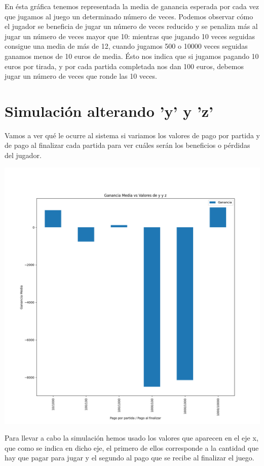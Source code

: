 \documentclass[11pt,a4paper]{report}
\begin{document}
En ésta gráfica tenemos representada la media de ganancia esperada por cada vez que jugamos al juego un determinado número de veces. Podemos observar cómo el jugador se beneficia de jugar un número de veces reducido y se penaliza más al jugar un número de veces mayor que 10: mientras que jugando 10 veces seguidas consigue una media de más de 12, cuando jugamos 500 o 10000 veces seguidas ganamos menos de 10 euros de media. Ésto nos indica que si jugamos pagando 10 euros por tirada, y por cada partida completada nos dan 100 euros, debemos jugar un número de veces que ronde las 10 veces.

\section{Simulación alterando 'y' y 'z'}
Vamos a ver qué le ocurre al sistema si variamos los valores de pago por partida y de pago al finalizar cada partida para ver cuáles serán los beneficios o pérdidas del jugador.

\begin{center}
	\includegraphics[width=0.6\textheight]{img/Cap-1/2-ganancia-media-vs-y-z.png}
\end{center}

Para llevar a cabo la simulación hemos usado los valores que aparecen en el eje x, que como se indica en dicho eje, el primero de ellos corresponde a la cantidad que hay que pagar para jugar y el segundo al pago que se recibe al finalizar el juego.
\end{document}
